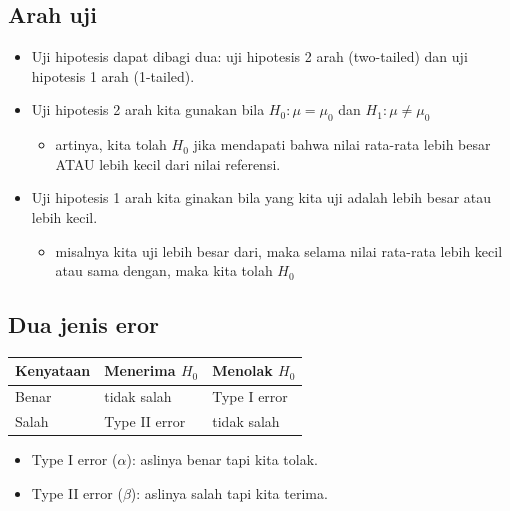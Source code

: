 \documentclass[
  letterpaper,
  DIV=11,
  numbers=noendperiod]{scrartcl}
\providecommand{\tightlist}{%
  \setlength{\itemsep}{0pt}\setlength{\parskip}{0pt}}\usepackage{longtable,booktabs,array}
\begin{document}
\hypertarget{arah-uji}{%
\subsection{Arah uji}\label{arah-uji}}

\begin{itemize}
\item
  Uji hipotesis dapat dibagi dua: uji hipotesis 2 arah (two-tailed) dan
  uji hipotesis 1 arah (1-tailed).
\item
  Uji hipotesis 2 arah kita gunakan bila \(H_0: \mu=\mu_0\) dan
  \(H_1: \mu\neq\mu_0\)

  \begin{itemize}
  \tightlist
  \item
    artinya, kita tolah \(H_0\) jika mendapati bahwa nilai rata-rata
    lebih besar ATAU lebih kecil dari nilai referensi.
  \end{itemize}
\item
  Uji hipotesis 1 arah kita ginakan bila yang kita uji adalah lebih
  besar atau lebih kecil.

  \begin{itemize}
  \tightlist
  \item
    misalnya kita uji lebih besar dari, maka selama nilai rata-rata
    lebih kecil atau sama dengan, maka kita tolah \(H_0\)
  \end{itemize}
\end{itemize}

\hypertarget{dua-jenis-eror}{%
\subsection{Dua jenis eror}\label{dua-jenis-eror}}

\begin{longtable}[]{@{}lll@{}}
\toprule\noalign{}
Kenyataan & Menerima \(H_0\) & Menolak \(H_0\) \\
\midrule\noalign{}
\endhead
\bottomrule\noalign{}
\endlastfoot
Benar & tidak salah & Type I error \\
Salah & Type II error & tidak salah \\
\end{longtable}

\begin{itemize}
\item
  Type I error (\(\alpha\)): aslinya benar tapi kita tolak.
\item
  Type II error (\(\beta\)): aslinya salah tapi kita terima.
\end{itemize}
\end{document}
